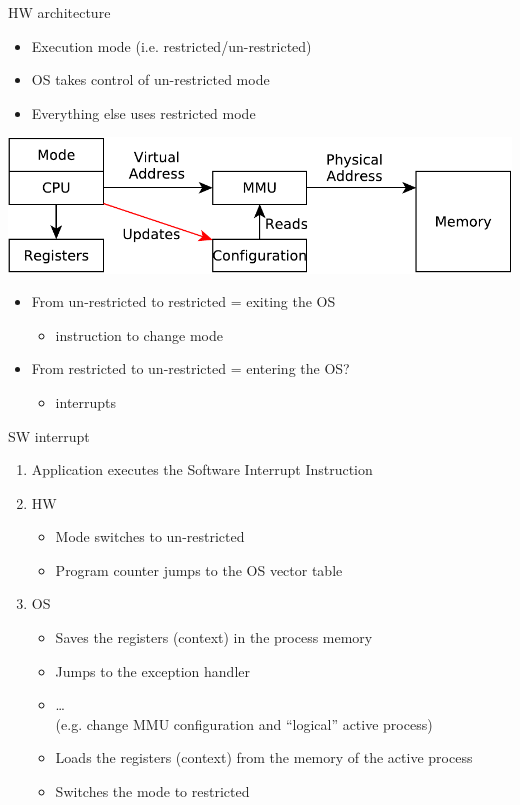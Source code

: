\documentclass{beamer}
\begin{document}
\begin{frame}{HW architecture}
  \begin{itemize}
  \item Execution mode (i.e. restricted/un-restricted)
  \item OS takes control of un-restricted mode
  \item Everything else uses restricted mode
  \end{itemize}
  \begin{center}
  \includegraphics[width=0.6\linewidth]{mode0}
  \end{center}
  \begin{itemize}
  \item<2-> From un-restricted to restricted = exiting the OS
  \begin{itemize}
    \item instruction to change mode
  \end{itemize}
  \item<3-> From restricted to un-restricted = entering the OS?
  \begin{itemize}
    \item<4-> interrupts
  \end{itemize}
  \end{itemize}
\end{frame}



\begin{frame}{SW interrupt}
  \begin{enumerate}
  \item<1-> Application executes the Software Interrupt Instruction
  \item<2-> HW
  \begin{itemize}
    \item Mode switches to un-restricted
    \item Program counter jumps to the OS \alert{vector table}
  \end{itemize}
  \item<3-> OS
  \begin{itemize}
    \item Saves the registers (context) in the process memory
    \item Jumps to the \alert{exception handler}
    \item \dots \\
 (e.g. change MMU configuration and ``logical'' active process)
    \item Loads the registers (context) from the memory of the  \alert{active}
      process
    \item Switches the mode to restricted
  \end{itemize}

\end{enumerate}
\end{frame}
\end{document}
